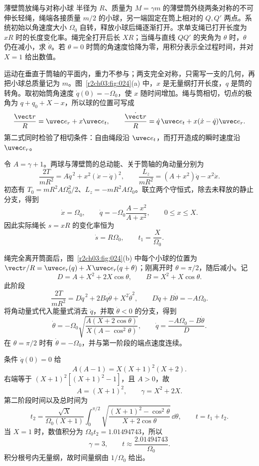 \begin{practicebox}{薄壁筒放绳与对称小球}
半径为 $R$、质量为 $M=\gamma m$ 的薄壁筒外绕两条对称的不可伸长轻绳，绳端各接质量 $m/2$ 的小球，另一端固定在筒上相对的 $Q,Q'$ 两点。系统初始以角速度大小 $\Omega_0$ 自转，释放小球后绳逐渐打开。求单支绳已打开长度为 $xR$ 时的长度变化率。绳完全打开后长 $XR$；当绳与直线 $QQ'$ 的夹角为 $\theta$ 时，$\theta$ 仍在减小，求 $\dot\theta$。若 $\theta=0$ 时筒的角速度恰降为零，用积分表示全过程时间，并对 $X=1$ 给出数值。
\label{r2ch03:pr:008}
\begin{solution}
运动在垂直于筒轴的平面内，重力不参与；两支完全对称，只需写一支的几何，再把小球总质量记为 $m$。图~\ref{r2ch03:fig:024}(a) 中，$x$ 是无量纲打开长度，$q$ 是筒的转角。取初始筒角速度 $\dot q(0)=-\Omega_0$，使 $x$ 随时间增加。绳与筒相切，切点的极角为 $q+q_0+X-x$，所以球的位置可写成
\[
 \frac{\vect r}{R}=\uvec e_r+x\uvec e_t,\qquad
 \frac{\dot{\vect r}}{R}=\dot q\,\uvec e_t
      +x(\dot x-\dot q)\uvec e_r.
\]
第二式同时检验了相切条件：自由绳段沿 $\uvec e_t$，而打开造成的瞬时速度沿 $\uvec e_r$。
\figCylinderBalls

令 $A=\gamma+1$。两球与薄壁筒的总动能、关于筒轴的角动量分别为
\[
 \frac{2T}{mR^2}=A\dot q^{\,2}+x^2(\dot x-\dot q)^2,
\qquad
 \frac{L_z}{mR^2}=(A+x^2)\dot q-x^2\dot x.
\]
初态有 $T_0=mR^2A\Omega_0^2/2$、$L_z=-mR^2A\Omega_0$。联立两个守恒式，除去未释放的静止分支，得到
\[
 \boxed{\dot x=\Omega_0},\qquad
 \boxed{\dot q=-\Omega_0\frac{A-x^2}{A+x^2}},\qquad 0\le x\le X.
\]
因此实际绳长 $s=xR$ 的变化率恒为
\[
 \boxed{\dot s=R\Omega_0},\qquad t_1=\frac{X}{\Omega_0}.
\]

绳完全离开筒面后，图~\ref{r2ch03:fig:024}(b) 中每个小球的位置为
$\vect r/R=\uvec e_r(q)+X\uvec e_r(q+\theta)$；刚离开时 $\theta=\pi/2$，随后减小。记
\[
 D=A+X^2+2X\cos\theta,\qquad
 B=X^2+X\cos\theta .
\]
此阶段
\[
 \frac{2T}{mR^2}=D\dot q^{\,2}+2B\dot q\dot\theta+X^2\dot\theta^2,
 \qquad D\dot q+B\dot\theta=-A\Omega_0.
\]
将角动量式代入能量式消去 $\dot q$，并取 $\dot\theta<0$ 的分支，得到
\[
 \boxed{\dot\theta=-\Omega_0
 \sqrt{\frac{A(X+2\cos\theta)}{X(A-\cos^2\theta)}}},
 \qquad
 \dot q=\frac{-A\Omega_0-B\dot\theta}{D}.
\]
在 $\theta=\pi/2$ 时有 $\dot\theta=-\Omega_0$，并与第一阶段的端点速度连续。

条件 $\dot q(0)=0$ 给
\[
 A(A-1)=X(X+1)^2(X+2).
\]
右端等于 $(X+1)^2[(X+1)^2-1]$，且 $A>0$，故
\[
 \boxed{A=(X+1)^2},\qquad \boxed{\gamma=X^2+2X}.
\]
第二阶段时间以及总时间为
\[
 t_2=\frac{\sqrt X}{\Omega_0(X+1)}
 \int_0^{\pi/2}\sqrt{\frac{(X+1)^2-\cos^2\theta}
 {X+2\cos\theta}}\,\dd\theta,
 \qquad \boxed{t=t_1+t_2}.
\]
当 $X=1$ 时，数值积分为 $\Omega_0t_2=1.01494743$，所以
\[
 \boxed{\gamma=3},\qquad
 \boxed{t\approx\frac{2.01494743}{\Omega_0}}.
\]
积分根号内无量纲，故时间量纲由 $1/\Omega_0$ 给出。
\end{solution}
\end{practicebox}

